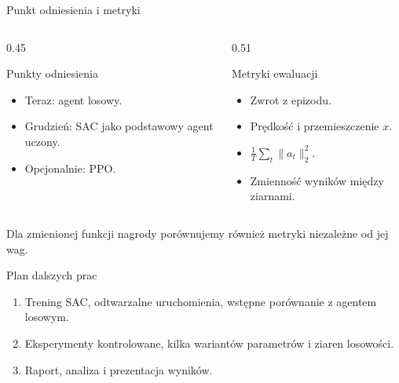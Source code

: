 \documentclass[aspectratio=169,11pt]{beamer}
\begin{document}
\begin{frame}{Punkt odniesienia i metryki}
  \begin{columns}[T,onlytextwidth]
    \begin{column}{0.45\textwidth}
      \begin{block}{Punkty odniesienia}
        \begin{itemize}
          \item Teraz: agent losowy.
          \item Grudzie\'n: SAC jako podstawowy agent uczony.
          \item Opcjonalnie: PPO.
        \end{itemize}
      \end{block}
    \end{column}
    \begin{column}{0.51\textwidth}
      \begin{block}{Metryki ewaluacji}
        \begin{itemize}
          \item Zwrot z epizodu.
          \item Pr\k{e}dko\'s\'c i przemieszczenie $x$.
          \item $\frac{1}{T}\sum_t\lVert a_t\rVert_2^2$.
          \item Zmienno\'s\'c wynik\'ow mi\k{e}dzy ziarnami.
        \end{itemize}
      \end{block}
    \end{column}
  \end{columns}
  \vspace{0.2em}
  \small Dla zmienionej funkcji nagrody por\'ownujemy r\'ownie\.z metryki niezale\.zne od jej wag.
\end{frame}

\begin{frame}{Plan dalszych prac}
  \begin{enumerate}
    \setlength{\itemsep}{0.6em}
    \item Trening SAC, odtwarzalne uruchomienia, wst\k{e}pne por\'ownanie z agentem losowym.
    \item Eksperymenty kontrolowane, kilka wariant\'ow parametr\'ow i ziaren losowo\'sci.
    \item Raport, analiza i prezentacja wynik\'ow.
  \end{enumerate}
\end{frame}
\end{document}
